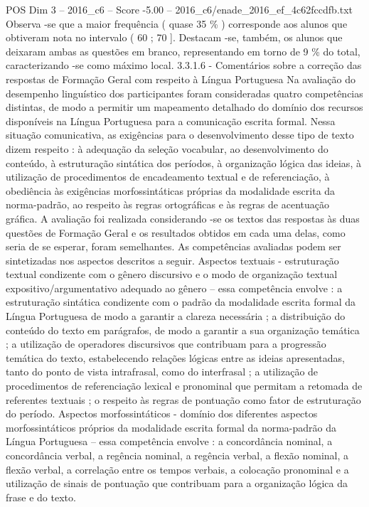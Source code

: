 \begin{textsample}{POS Dim 3 – 2016\_c6 – Score -5.00 – 2016\_c6/enade\_2016\_ef\_4c62fccdfb.txt}
Observa -se que a maior frequência ( quase 35 \% ) corresponde aos alunos que obtiveram nota no intervalo ( 60 ; 70 ].
Destacam -se, também, os alunos que deixaram ambas as questões em branco, representando em torno de 9 \% do total, caracterizando -se como máximo local. 3.3.1.6 - Comentários sobre a correção das respostas de Formação Geral com respeito à Língua Portuguesa Na avaliação do desempenho linguístico dos participantes foram consideradas quatro competências distintas, de modo a permitir um mapeamento detalhado do domínio dos recursos disponíveis na Língua Portuguesa para a comunicação escrita formal.
Nessa situação comunicativa, as exigências para o desenvolvimento desse tipo de texto dizem respeito : à adequação da seleção vocabular, ao desenvolvimento do conteúdo, à estruturação sintática dos períodos, à organização lógica das ideias, à utilização de procedimentos de encadeamento textual e de referenciação, à obediência às exigências morfossintáticas próprias da modalidade escrita da norma-padrão, ao respeito às regras ortográficas e às regras de acentuação gráfica.
A avaliação foi realizada considerando -se os textos das respostas às duas questões de Formação Geral e os resultados obtidos em cada uma delas, como seria de se esperar, foram semelhantes.
As competências avaliadas podem ser sintetizadas nos aspectos descritos a seguir.
Aspectos textuais - estruturação textual condizente com o gênero discursivo e o modo de organização textual expositivo/argumentativo adequado ao gênero – essa competência envolve : a estruturação sintática condizente com o padrão da modalidade escrita formal da Língua Portuguesa de modo a garantir a clareza necessária ; a distribuição do conteúdo do texto em parágrafos, de modo a garantir a sua organização temática ; a utilização de operadores discursivos que contribuam para a progressão temática do texto, estabelecendo relações lógicas entre as ideias apresentadas, tanto do ponto de vista intrafrasal, como do interfrasal ; a utilização de procedimentos de referenciação lexical e pronominal que permitam a retomada de referentes textuais ; o respeito às regras de pontuação como fator de estruturação do período.
Aspectos morfossintáticos - domínio dos diferentes aspectos morfossintáticos próprios da modalidade escrita formal da norma-padrão da Língua Portuguesa – essa competência envolve : a concordância nominal, a concordância verbal, a regência nominal, a regência verbal, a flexão nominal, a flexão verbal, a correlação entre os tempos verbais, a colocação pronominal e a utilização de sinais de pontuação que contribuam para a organização lógica da frase e do texto.

\end{textsample}
